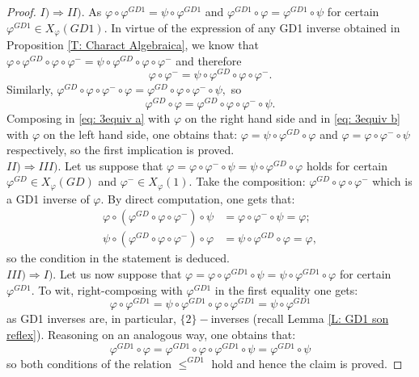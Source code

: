 \documentclass[10pt,a4paper]{amsart}
\newcommand{\f}{\varphi}
\newcommand{\g}{\psi}
\begin{document}
\begin{proof}
$I) \Longrightarrow II).$ As $\f \circ \f^{GD1}=\g\circ \f^{GD1}$ and $\f^{GD1}\circ \f =\f^{GD1}\circ \g $ for certain $\f^{GD1}\in X_{\f}(GD1).$ In virtue of the expression of any GD1 inverse obtained in Proposition \ref{T: Charact Algebraica}, we know that $\f\circ \f^{GD}\circ \f \circ \f^{-}=\g\circ\f^{GD}\circ \f \circ \f^{-} $ and therefore \begin{equation}\label{eq: 3equiv a}
\f\circ \f^{-}=\g\circ \f^{GD}\circ \f \circ \f^{-}.
\end{equation}
Similarly, $\f^{GD}\circ \f \circ \f^{-}\circ \f =\f^{GD}\circ \f \circ \f^{-}\circ \g ,$ so \begin{equation}\label{eq: 3equiv b}
\f^{GD}\circ \f=\f^{GD}\circ \f \circ \f^{-}\circ \g .
\end{equation}
Composing in \eqref{eq: 3equiv a} with $\f$ on the right hand side and in \eqref{eq: 3equiv b} with $\f$ on the left hand side, one obtains that: $\f=\g\circ \f^{GD}\circ \f$ and $\f=\f\circ\f^{-}\circ \g$ respectively, so the first implication is proved. \\
$II) \Longrightarrow III).$ Let us suppose that $\f=\f\circ \f^{-}\circ \g=\g \circ \f^{GD}\circ \f$ holds for certain $\f^{GD}\in X_{\f}(GD)$ and $\f^{-}\in X_{\f}(1).$ Take the composition: $\f^{GD}\circ \f \circ \f^{-}$ which is a GD1 inverse of $\f .$ By direct computation, one gets that: \begin{align*}
\f\circ (\f^{GD}\circ \f \circ \f^{-})\circ \g & = \f \circ \f^{-}\circ \g =\f ;\\
\g\circ (\f^{GD}\circ \f \circ \f^{-})\circ \f & =\g \circ \f^{GD}\circ \f=\f ,
\end{align*}
so the condition in the statement is deduced.\\
$III)\Longrightarrow I).$ Let us now suppose that $\f=\f\circ \f^{GD1}\circ \g=\g\circ \f^{GD1}\circ \f $ for certain $\f^{GD1}.$ To wit, right-composing with $\f^{GD1}$ in the first equality one gets: $$\f\circ \f^{GD1}=\g \circ \f^{GD1}\circ \f \circ \f^{GD1}=\g \circ \f^{GD1} $$ 
as GD1 inverses are, in particular, $\{2 \}-$inverses (recall Lemma \ref{L: GD1 son reflex}). Reasoning on an analogous way, one obtains that: $$\f^{GD1}\circ \f=\f^{GD1}\circ \f \circ \f^{GD1}\circ \g =\f^{GD1}\circ \g $$ so both conditions of the relation $\leq^{GD1}$ hold and hence the claim is proved.
\end{proof}
\end{document}
